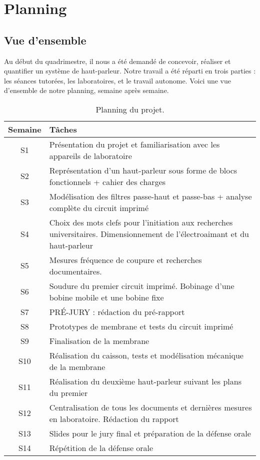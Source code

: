 

\section{Planning}

\subsection{Vue d'ensemble}
Au début du quadrimestre, il nous a été demandé de concevoir, réaliser et quantifier un système de haut-parleur.
Notre travail a été réparti en trois parties : les séances tutorées, les laboratoires, et le travail autonome. 
Voici une vue d'ensemble de notre planning, semaine après semaine. 

\begin{table}[!htb]
	\centering
	\begin{tabular}{|c|p{9cm}|}
		\hline 
		Semaine & Tâches \\
		\hline
			S1 & Présentation du projet et familiarisation avec les appareils de laboratoire \\
			S2 & Représentation d'un haut-parleur sous forme de blocs fonctionnels + cahier des charges \\
			S3 & Modélisation des filtres passe-haut et passe-bas + analyse complète du circuit imprimé \\
			S4 & Choix des mots clefs pour l'initiation aux recherches universitaires. Dimensionnement de l'électroaimant et du haut-parleur \\
			S5 & Mesures fréquence de coupure et recherches documentaires. \\
			S6 & Soudure du premier circuit imprimé. Bobinage d'une bobine mobile et une bobine fixe \\
			S7 & PRÉ-JURY : rédaction du pré-rapport \\
			S8 & Prototypes de membrane et tests du circuit imprimé \\
			S9 & Finalisation de la membrane \\
			S10 & Réalisation du caisson, tests et modélisation mécanique de la membrane \\
			S11 & Réalisation du deuxième haut-parleur suivant les plans du premier \\
			S12 & Centralisation de tous les documents et dernières mesures en laboratoire. Rédaction du rapport \\
			S13 & Slides pour le jury final et préparation de la défense orale \\
			S14 & Répétition de la défense orale \\
		\hline
	\end{tabular}
	\caption{Planning du projet.}
\end{table}

